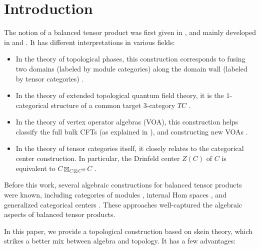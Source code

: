 \section{Introduction}


The notion of a balanced tensor product was first given in
\cite{etingof/fusion-cat-and-homotopy}, and mainly developed in
\cite{douglas/balanced-product} and \cite{douglas/dualizable-tensor-categories}.
It has different interpretations in various fields:
\begin{itemize}
  \item In the theory of topological phases, this construction corresponds to
        fusing two domains (labeled by module categories) along the domain
        wall (labeled by tensor categories) \cite{kong/topological-order}.
  \item In the theory of extended topological quantum field theory, it is the
        $1$-categorical structure of a common target $3$-category $TC$
        \cite{douglas/dualizable-tensor-categories}.
  \item In the theory of vertex operator algebras (VOA), this construction helps
        classify the full bulk CFTs (as explained in
        \cite{gannon/exotic-quantum-subgroup}), and constructing new VOAs
        \cite{gannon/sln-II}.
  \item In the theory of tensor categories itself, it closely relates to the
        categorical center construction. In particular, the Drinfeld center
        $Z(C)$ of $C$ is equivalent to $C \boxtimes_{C \boxtimes C^{op}} C$
        \cite{kirillov/string-net-tv}
        \cite{douglas/dualizable-tensor-categories}.
\end{itemize}

\noindent Before this work, several algebraic constructions for balanced tensor products
were known, including categories of modules \cite{douglas/balanced-product},
internal Hom spaces \cite{davydov/picard}, and generalized categorical centers
\cite{etingof/fusion-cat-and-homotopy} \cite{kirillov/fact-homo-4d-tqft}
\cite{hoek/master}. These approaches well-captured the algebraic aspects of
balanced tensor products.

In this paper, we provide a topological construction based on skein theory,
which strikes a better mix between algebra and topology. It has a few advantages:

